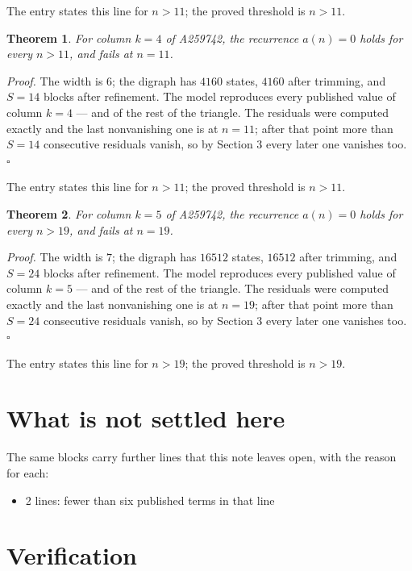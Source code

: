 \documentclass[11pt]{article}
\newtheorem{theorem}{Theorem}
\theoremstyle{definition}
\begin{document}
The entry states this line for $n > 11$; the proved threshold is $n > 11$.

\begin{theorem} For column $k = 4$ of A259742, the recurrence $a(n) = 0$ holds for every $n > 11$, and fails at $n = 11$.\end{theorem}

{\itshape Proof.} The width is $6$; the digraph has $4160$ states, $4160$ after trimming, and $S = 14$ blocks after refinement. The model reproduces every published value of column $k = 4$ --- and of the rest of the triangle. The residuals were computed exactly and the last nonvanishing one is at $n = 11$; after that point more than $S = 14$ consecutive residuals vanish, so by Section 3 every later one vanishes too. $\square$

The entry states this line for $n > 11$; the proved threshold is $n > 11$.

\begin{theorem} For column $k = 5$ of A259742, the recurrence $a(n) = 0$ holds for every $n > 19$, and fails at $n = 19$.\end{theorem}

{\itshape Proof.} The width is $7$; the digraph has $16512$ states, $16512$ after trimming, and $S = 24$ blocks after refinement. The model reproduces every published value of column $k = 5$ --- and of the rest of the triangle. The residuals were computed exactly and the last nonvanishing one is at $n = 19$; after that point more than $S = 24$ consecutive residuals vanish, so by Section 3 every later one vanishes too. $\square$

The entry states this line for $n > 19$; the proved threshold is $n > 19$.

\section{What is not settled here}

The same blocks carry further lines that this note leaves open, with the reason for each:

\begin{itemize}

\item 2 lines: fewer than six published terms in that line

\end{itemize}

\section{Verification}
\end{document}
